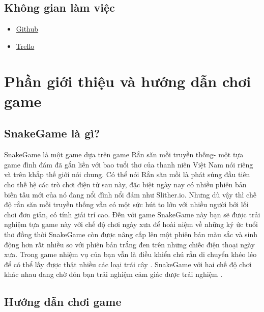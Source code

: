 \documentclass[13pt,a4paper]{article}
\begin{document}
\subsection{Không gian làm việc}
\begin{itemize}
   \item \href {https://github.com/ngoctienUIT/SnakeGame} { Github }
    \item \href {https://trello.com/b/aph53kLG} { Trello }
\end{itemize}
\newpage
\section{Phần giới thiệu và hướng dẫn chơi game }
\subsection{SnakeGame là gì?}
\setlength{\parindent}{0.5 cm}
SnakeGame là một game dựa trên game Rắn săn mồi truyền thống- một tựa game đình đám đã gắn liền với bao tuổi thơ của thanh niên Việt Nam nói riêng và trên khắp thế giới nói chung. Có thể nói Rắn săn mồi là phát súng đầu tiên cho thế hệ các trò chơi điện tử sau này, đặc biệt ngày nay có nhiều phiên bản biến tấu mới của nó đang nổi đình nổi đám như Slither.io. Nhưng dù vậy thì chế độ rắn săn mồi truyền thống vẫn có một sức hút to lớn với nhiều người bởi lối chơi đơn giản, có tính giải trí cao. Đến với game SnakeGame này bạn sẽ được trải nghiệm tựa game này với chế độ chơi ngày xưa để hoài niệm về những ký ức tuổi thơ đồng thời SnakeGame còn được nâng cấp lên  một phiên bản màu sắc và sinh động hơn rất nhiều so với phiên bản trắng đen trên những chiếc điện thoại ngày xưa. Trong game nhiệm vụ của bạn vẫn là điều khiển chú rắn di chuyển khéo léo để có thể lấy được thật nhiều các loại trái cây . SnakeGame  với hai chế độ chơi khác nhau đang chờ đón bạn trải nghiệm cảm giác được trải nghiệm .
\subsection{Hướng dẫn chơi game}
\end{document}
